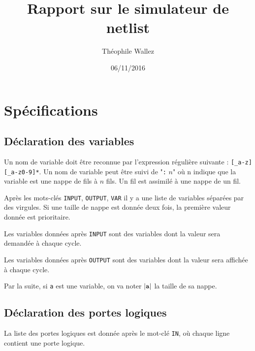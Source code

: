 \documentclass[12pt]{article}
\title{Rapport sur le simulateur de netlist}
\author{Théophile Wallez}
\date{06/11/2016}
\begin{document}
\maketitle

\section{Spécifications}

\subsection{Déclaration des variables}

Un nom de variable doit être reconnue par l'expression régulière suivante : \verb$[_a-z][_a-z0-9]*$. Un nom de variable peut être suivi de "\verb$:$ $n$" où n indique que la variable est une nappe de fils à $n$ fils. Un fil est assimilé à une nappe de un fil.

Après les mots-clés \verb$INPUT$, \verb$OUTPUT$, \verb$VAR$ il y a une liste de variables séparées par des virgules. Si une taille de nappe est donnée deux fois, la première valeur donnée est prioritaire.

Les variables données après \verb$INPUT$ sont des variables dont la valeur sera demandée à chaque cycle.

Les variables données après \verb$OUTPUT$ sont des variables dont la valeur sera affichée à chaque cycle.

Par la suite, si \verb$a$ est une variable, on va noter $|\verb;a;|$ la taille de sa nappe.

\subsection{Déclaration des portes logiques}

La liste des portes logiques est donnée après le mot-clé \verb$IN$, où chaque ligne contient une porte logique.
\end{document}
